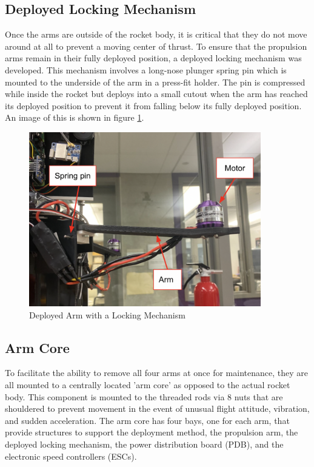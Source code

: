 \subsection{Deployed Locking Mechanism}
Once the arms are outside of the rocket body, it is critical that they do not move around at all to prevent a moving center of thrust. To ensure that the propulsion arms remain in their fully deployed position, a deployed locking mechanism was developed. This mechanism involves a long-nose plunger spring pin which is mounted to the underside of the arm in a press-fit holder. The pin is compressed while inside the rocket but deploys into a small cutout when the arm has reached its deployed position to prevent it from falling below its fully deployed position. An image of this is shown in figure \ref{fig:deployedarm}.

\begin{figure}[H]
    \centering
    \includegraphics[width=0.9\textwidth]{src/figs/armdeployedlabeled.png}
    \caption{Deployed Arm with a Locking Mechanism}
    \label{fig:deployedarm}
\end{figure}

\subsection{Arm Core}
To facilitate the ability to remove all four arms at once for maintenance, they are all mounted to a centrally located 'arm core' as opposed to the actual rocket body. This component is mounted to the threaded rods via 8 nuts that are shouldered to prevent movement in the event of unusual flight attitude, vibration, and sudden acceleration. The arm core has four bays, one for each arm, that provide structures to support the deployment method, the propulsion arm, the deployed locking mechanism, the power distribution board (PDB), and the electronic speed controllers (ESCs).

